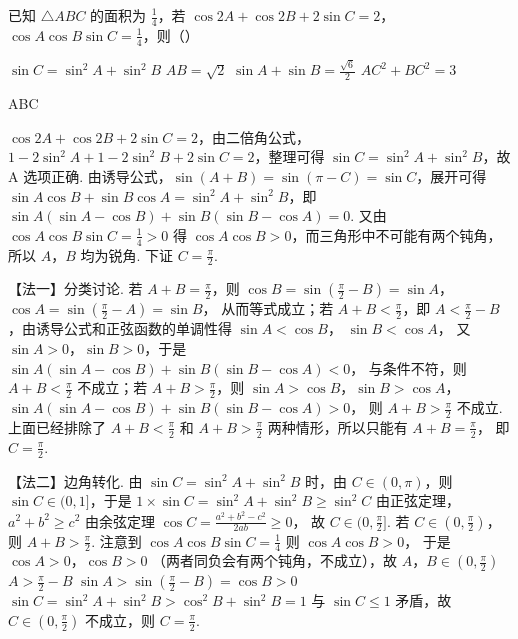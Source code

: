 \begin{problem}
已知 \(\triangle ABC\) 的面积为 \(\frac{1}{4}\)，若 \(\cos 2A + \cos 2B + 2\sin C = 2\)，\(\cos A \cos B \sin C = \frac{1}{4}\)，则（\quad）

\choices
    {\(\sin C = \sin^2 A + \sin^2 B\)}
    {\(AB = \sqrt{2}\)}
    {\(\sin A + \sin B = \frac{\sqrt{6}}{2}\)}
    {\(AC^2 + BC^2 = 3\)}
\end{problem}

\begin{answer}
ABC
\end{answer}

\begin{solution}
\(\cos 2A + \cos 2B + 2\sin C = 2\)，由二倍角公式，\(1 - 2\sin^2 A + 1 - 2\sin^2 B + 2\sin C = 2\)，整理可得 \(\sin C = \sin^2 A + \sin^2 B\)，故 A 选项正确. 由诱导公式，\(\sin (A + B) = \sin (\pi - C) = \sin C\)，展开可得 \(\sin A \cos B + \sin B \cos A = \sin^2 A + \sin^2 B\)，即 \(\sin A (\sin A - \cos B) + \sin B (\sin B - \cos A) = 0\). 又由 \(\cos A\cos B\sin C=\frac{1}{4}>0\) 得 \(\cos A\cos B>0\)，而三角形中不可能有两个钝角，所以 \(A\)，\(B\) 均为锐角. 下证 \(C = \frac{\pi}{2}\).

【法一】分类讨论. 若 \(A + B = \frac{\pi}{2}\)，则
\(\cos B=\sin\left(\frac{\pi}{2}-B\right)=\sin A\)，\(\cos A=\sin\left(\frac{\pi}{2}-A\right)=\sin B\)，
从而等式成立；若 \(A + B < \frac{\pi}{2}\)，即 \(A < \frac{\pi}{2} - B\)，由诱导公式和正弦函数的单调性得
\(\sin A < \cos B\)，
\(\sin B < \cos A\)，
又 \(\sin A > 0\)，\(\sin B > 0\)，于是
\(\sin A (\sin A - \cos B) + \sin B (\sin B - \cos A) < 0\)，
与条件不符，则 \(A + B < \frac{\pi}{2}\) 不成立；若 \(A + B > \frac{\pi}{2}\)，则
\(\sin A > \cos B\)，\(\sin B > \cos A\)，
\(\sin A (\sin A - \cos B) + \sin B (\sin B - \cos A) > 0\)，
则 \(A + B > \frac{\pi}{2}\) 不成立.
上面已经排除了 \(A+B<\frac{\pi}{2}\) 和 \(A+B>\frac{\pi}{2}\) 两种情形，所以只能有
\(A + B = \frac{\pi}{2}\)，
即 \(C = \frac{\pi}{2}\).

【法二】边角转化. 由 \(\sin C = \sin^2 A + \sin^2 B\) 时，由 \(C \in (0,\pi)\)，则 \(\sin C \in (0,1]\)，于是
\(1 \times \sin C = \sin^2 A + \sin^2 B \ge \sin^2 C\)
由正弦定理，
\(a^2 + b^2 \ge c^2\)
由余弦定理
\(\cos C=\frac{a^2+b^2-c^2}{2ab}\ge 0\)，
故 \(C \in (0,\frac{\pi}{2}]\). 若 \(C \in (0,\frac{\pi}{2})\)，则 \(A + B > \frac{\pi}{2}\).
注意到
\(\cos A \cos B \sin C = \frac{1}{4}\)
则
\(\cos A \cos B > 0\)，
于是
\(\cos A > 0\)，\(\cos B > 0\)
（两者同负会有两个钝角，不成立），故
\(A\)，\(B \in (0, \frac{\pi}{2})\)
\(A > \frac{\pi}{2} - B\)
\(
\sin A > \sin \left(\frac{\pi}{2} - B\right) = \cos B > 0
\)
\(
\sin C=\sin^2 A+\sin^2 B>\cos^2 B+\sin^2 B=1
\)
与 \(\sin C \le 1\) 矛盾，故 \(C \in (0,\frac{\pi}{2})\) 不成立，则 \(C = \frac{\pi}{2}\).


\end{solution}
